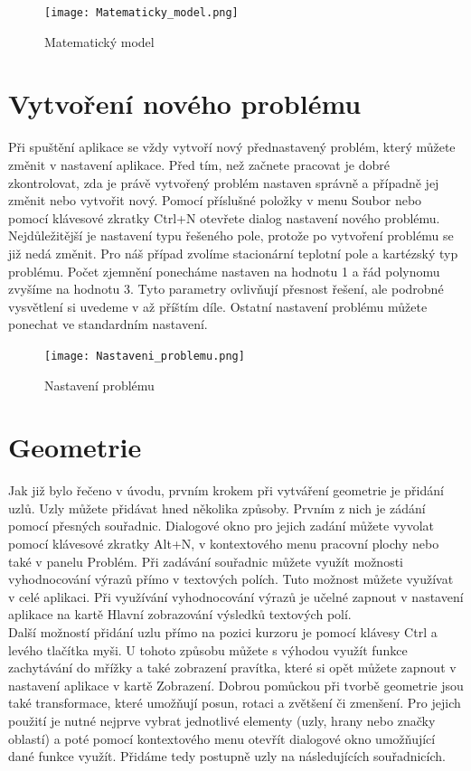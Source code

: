 \documentclass[a4paper, oneside]{article}
\begin{document}
\begin{figure}[htbp]
\centering
\texttt{[image: Matematicky\_model.png]}\\
\caption{Matematický model}
\end{figure}

\section{Vytvoření nového problému}

	Při spuštění aplikace se vždy vytvoří nový přednastavený problém, který můžete změnit v nastavení aplikace. Před tím, než začnete pracovat je dobré zkontrolovat, zda je právě vytvořený problém nastaven správně a případně jej změnit nebo vytvořit nový. Pomocí příslušné položky v menu Soubor nebo pomocí klávesové zkratky Ctrl+N otevřete dialog nastavení nového problému. Nejdůležitější je nastavení typu řešeného pole, protože po vytvoření problému se již nedá změnit. Pro náš případ zvolíme stacionární teplotní pole a kartézský typ problému. Počet zjemnění ponecháme nastaven na hodnotu 1 a řád polynomu zvyšíme na hodnotu 3. Tyto parametry ovlivňují přesnost řešení, ale podrobné vysvětlení si uvedeme v až příštím díle. Ostatní nastavení problému můžete ponechat ve standardním nastavení.\\
	
\begin{figure}[htbp]
\centering
\texttt{[image: Nastaveni\_problemu.png]}\\
\caption{Nastavení problému}
\end{figure}

\section{Geometrie}
	Jak již bylo řečeno v úvodu, prvním krokem při vytváření geometrie je přidání uzlů. Uzly můžete přidávat hned několika způsoby. Prvním z nich je zádání pomocí přesných souřadnic. Dialogové okno pro jejich zadání můžete vyvolat pomocí klávesové zkratky Alt+N, v kontextového menu pracovní plochy nebo také v panelu Problém. Při zadávání souřadnic můžete využít možnosti vyhodnocování výrazů přímo v textových polích. Tuto možnost můžete využívat v celé aplikaci. Při využívání vyhodnocování výrazů je učelné zapnout v nastavení aplikace na kartě Hlavní zobrazování výsledků textových polí.\\
	Další možností přidání uzlu přímo na pozici kurzoru je pomocí klávesy Ctrl a levého tlačítka myši. U tohoto způsobu můžete s výhodou využít funkce zachytávání do mřížky a také zobrazení pravítka, které si opět můžete zapnout v nastavení aplikace v kartě Zobrazení. Dobrou pomůckou při tvorbě geometrie jsou také transformace, které umožňují posun, rotaci a zvětšení či zmenšení. Pro jejich použití je nutné nejprve vybrat jednotlivé elementy (uzly, hrany nebo značky oblastí) a poté pomocí kontextového menu otevřít dialogové okno umožňující dané funkce využít. Přidáme tedy postupně uzly na následujících souřadnicích.\\
\end{document}
